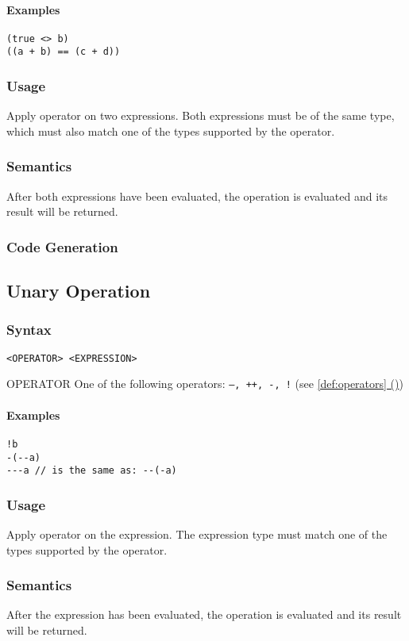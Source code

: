 \documentclass[twoside]{report}
\newcommand*{\fullref}[1]{\hyperref[{#1}]{\ref*{#1} (\nameref*{#1})}}
\newenvironment{mycompactdesc}{\begin{adjustwidth}{0.53cm}{}\begin{compactdesc}}{\end{compactdesc}\end{adjustwidth}}
\begin{document}
\paragraph{Examples}
\begin{verbatim}
(true <> b)
((a + b) == (c + d))
\end{verbatim}
\subsubsection*{Usage}
Apply operator on two expressions. Both expressions must be of the same type, which must also match one of the types supported by the operator.
\subsubsection*{Semantics}
After both expressions have been evaluated, the operation is evaluated and its result will be returned.
\subsubsection*{Code Generation}


\subsection{Unary Operation}
\label{def:unary_operation}
\subsubsection*{Syntax}
\texttt{<OPERATOR> <EXPRESSION>}
\begin{mycompactdesc}
	\item[OPERATOR] One of the following operators: \texttt{--, ++, -, !} (see \fullref{def:operators})
\end{mycompactdesc}
\paragraph{Examples}
\begin{verbatim}
!b
-(--a)
---a // is the same as: --(-a)
\end{verbatim}
\subsubsection*{Usage}
Apply operator on the expression. The expression type must match one of the types supported by the operator.
\subsubsection*{Semantics}
After the expression has been evaluated, the operation is evaluated and its result will be returned.
\end{document}
